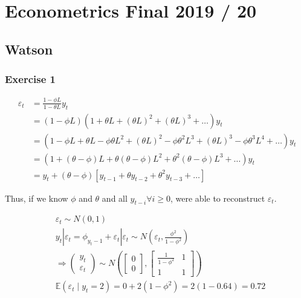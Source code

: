 \section{Econometrics Final 2019 / 20}

{
\subsection*{Watson}

{
\subsubsection*{Exercise 1}

\begin{enumerate}[label=(\alph*)]
{\item 
$$
\begin{aligned}
\varepsilon_{t} & =\frac{1-\phi L}{1-\theta L} y_{t} \\
& =(1-\phi L)\left(1+\theta L+(\theta L)^{2}+(\theta L)^{3}+\ldots\right) y_{t} \\
& =\left(1-\phi L+\theta L-\phi \theta L^{2}+(\theta L)^{2}-\phi \theta^{2} L^{3}+(\theta L)^{3}-\phi \theta^{3} L^{4}+\ldots\right) y_{t} \\
& =\left(1+(\theta-\phi) L+\theta(\theta-\phi) L^{2}+\theta^{2}(\theta-\phi) L^{3}+\ldots\right) y_{t} \\
& =y_{t}+(\theta-\phi)\left[y_{t-1}+\theta y_{t-2}+\theta^{2} y_{t-3}+\ldots\right]
\end{aligned}
$$

Thus, if we know $\phi$ and $\theta$ and all $y_{t-i} \forall i \geqslant 0$, were able to reconstruct $\varepsilon_{t}$.
}
{\item 
$$
\begin{aligned}
& \varepsilon_{t} \sim N(0,1) \\
& y_{t}\left|\varepsilon_{t}=\phi_{y_{t}-1}+\varepsilon_{t}\right| \varepsilon_{t} \sim N\left(\varepsilon_{t}, \frac{\phi^{2}}{1-\phi^{2}}\right) \\
& \Rightarrow\left(\begin{array}{l}
y_{t} \\
\varepsilon_{t}
\end{array}\right) \sim N\left(\left[\begin{array}{l}
0 \\
0
\end{array}\right],\left[\begin{array}{cc}
\frac{1}{1-\phi^{2}} & 1 \\
1 & 1
\end{array}\right]\right) \\
& \mathbb{E}\left(\varepsilon_{t} \mid y_{t}=2\right)=0+2\left(1-\phi^{2}\right)=2(1-0.64)=0.72
\end{aligned}
$$
}
\end{enumerate}
}
{
}}

